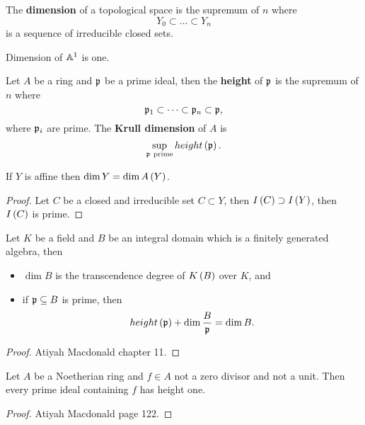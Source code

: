 \begin{definition}
The \textbf{dimension} of a topological space is the supremum of $ n $ where
$$ Y_0 \subset \dots \subset Y_n $$
is a sequence of irreducible closed sets.
\end{definition}

\begin{example}
Dimension of $ \AA^1 $ is one.
\end{example}

\begin{definition}
Let $ A $ be a ring and $ \ppp $ be a prime ideal, then the \textbf{height} of $ \ppp $ is the supremum of $ n $ where
$$ \ppp_1 \subset \dots \subset \ppp_n \subset \ppp, $$
where $ \ppp_i $ are prime. The \textbf{Krull dimension} of $ A $ is
$$ \sup_{\ppp \ \text{prime}} height\br{\ppp}. $$
\end{definition}

\begin{proposition}
If $ Y $ is affine then $ \dim Y = \dim A\br{Y} $.
\end{proposition}

\begin{proof}
Let $ C $ be a closed and irreducible set $ C \subset Y $, then $ I\br{C} \supset I\br{Y} $, then $ I\br{C} $ is prime.
\end{proof}

\begin{proposition}
Let $ K $ be a field and $ B $ be an integral domain which is a finitely generated algebra, then
\begin{itemize}
\item $ \dim B $ is the transcendence degree of $ K\br{B} $ over $ K $, and
\item if $ \ppp \subseteq B $ is prime, then
$$ height\br{\ppp} + \dim \dfrac{B}{\ppp} = \dim B. $$
\end{itemize}
\end{proposition}

\begin{proof}
Atiyah Macdonald chapter 11.
\end{proof}

\begin{proposition}
Let $ A $ be a Noetherian ring and $ f \in A $ not a zero divisor and not a unit. Then every prime ideal containing $ f $ has height one.
\end{proposition}

\begin{proof}
Atiyah Macdonald page 122.
\end{proof}

